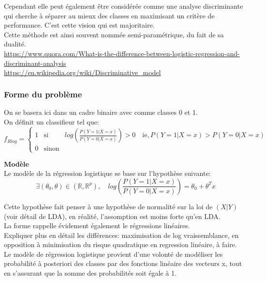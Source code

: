 \documentclass[a4paper]{article}
\theoremstyle{plain}
\begin{document}
Cependant elle peut également être considérée comme une analyse discriminante qui cherche à séparer au mieux des classes en maximisant un critère de performance. C'est cette vision qui est majoritaire.\\

Cette méthode est ainsi souvent nommée semi-paramétrique, du fait de sa dualité.\\

\url{https://www.quora.com/What-is-the-difference-between-logistic-regression-and-discriminant-analysis}\\

\url{https://en.wikipedia.org/wiki/Discriminative_model}\\

\subsubsection{Forme du problème}
On se basera ici dans un cadre binaire avec comme classes 0 et 1.\\
On définit un classifieur tel que:
$$
f_{Rlog}=
\left\lbrace
\begin{array}{ccc}
1  & \mbox{si} & log(\frac{P(Y=1|X=x)}{P(Y=0|X=x)})>0 \quad \mbox{ie}, P(Y=1|X=x)>P(Y=0|X=x)\\
0 & \mbox{sinon}
\end{array}\right.
$$

\textbf{Modèle}\\
Le modèle de la régression logistique se base sur l'hypothèse suivante:
$$\exists (\theta_0,\theta) \in (\mathbb{R},\mathbb{R}^p), \quad log(\frac{P(Y=1|X=x)}{P(Y=0|X=x)}) = \theta_0 + \theta^T x$$

Cette hypothèse fait penser à une hypothèse de normalité sur la loi de $(X|Y)$ (voir détail de LDA), en réalité, l'assomption est moins forte qu'en LDA.\\

La forme rappelle évidement également le régressions linéaires.\\

Expliquer plus en détail les différences: maximisation de log vraissemblance, en opposition à minimisation du risque quadratique en regression linéaire, à faire.\\

Le modèle de régression logistique provient d'une volonté de modéliser les probabilité à posteriori des classes par des fonctions linéaire des vecteurs x, tout en s'assurant que la somme des probabilités soit égale à 1.
\end{document}

